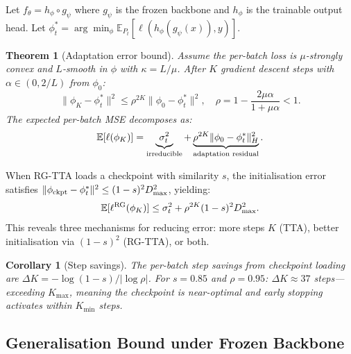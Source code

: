 \documentclass[journal]{IEEEtran}
\newtheorem{theorem}{Theorem}
\newtheorem{corollary}{Corollary}
\begin{document}
Let $f_\theta = h_\phi \circ g_\psi$ where $g_\psi$ is the frozen backbone and $h_\phi$ is the trainable output head. Let $\phi^*_t = \arg\min_\phi \mathbb{E}_{P_t}[\ell(h_\phi(g_\psi(x)), y)]$.

\begin{theorem}[Adaptation error bound]
\label{thm:adaptation}
Assume the per-batch loss is $\mu$-strongly convex and $L$-smooth in $\phi$ with $\kappa = L/\mu$. After $K$ gradient descent steps with $\alpha \in (0, 2/L)$ from $\phi_0$:
\begin{equation}
    \|\phi_K - \phi^*_t\|^2 \leq \rho^{2K} \|\phi_0 - \phi^*_t\|^2, \quad \rho = 1 - \frac{2\mu\alpha}{1 + \mu\alpha} < 1.
    \label{eq:gd_rate}
\end{equation}
The expected per-batch MSE decomposes as:
\begin{equation}
    \mathbb{E}[\ell(\phi_K)] = \underbrace{\sigma^2_t}_{\textup{irreducible}} + \underbrace{\rho^{2K} \|\phi_0 - \phi^*_t\|^2_H}_{\textup{adaptation residual}}.
    \label{eq:error_decomp}
\end{equation}
\end{theorem}

When RG-TTA loads a checkpoint with similarity $s$, the initialisation error satisfies $\|\phi_{\textup{ckpt}} - \phi^*_t\|^2 \leq (1-s)^2 D^2_{\max}$, yielding:
\begin{equation}
    \mathbb{E}[\ell^{\textup{RG}}(\phi_K)] \leq \sigma^2_t + \rho^{2K}(1-s)^2 D^2_{\max}.
    \label{eq:rg_error}
\end{equation}
This reveals three mechanisms for reducing error: more steps $K$ (TTA), better initialisation via $(1{-}s)^2$ (RG-TTA), or both.

\begin{corollary}[Step savings]
\label{cor:steps}
The per-batch step savings from checkpoint loading are $\Delta K = -\log(1{-}s)/|\log\rho|$. For $s = 0.85$ and $\rho = 0.95$: $\Delta K \approx 37$ steps---exceeding $K_{\max}$, meaning the checkpoint is near-optimal and early stopping activates within $K_{\min}$ steps.
\end{corollary}

\subsection{Generalisation Bound under Frozen Backbone}
\end{document}
